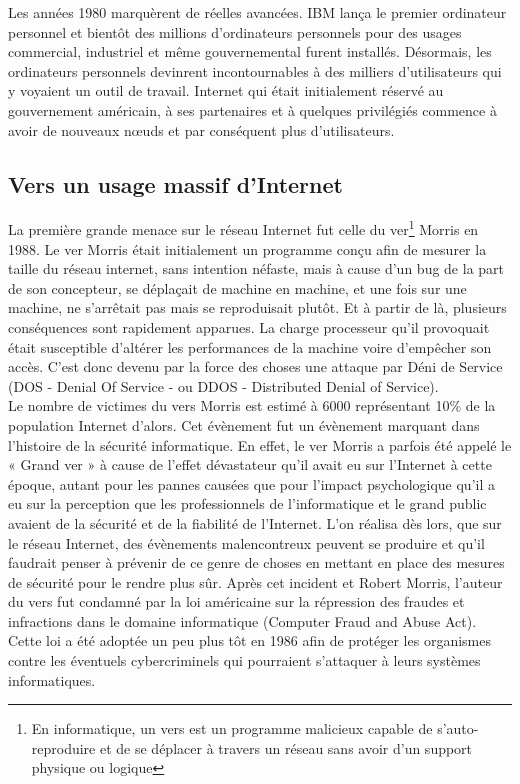 Les années 1980 marquèrent de réelles avancées. IBM lança le premier ordinateur personnel et bientôt des millions d’ordinateurs personnels pour des usages commercial, industriel et même gouvernemental furent installés. Désormais, les ordinateurs personnels devinrent incontournables à des milliers d’utilisateurs qui y voyaient un outil de travail. Internet qui était initialement réservé au gouvernement américain, à ses partenaires et à quelques privilégiés commence à avoir de nouveaux nœuds et par conséquent plus d’utilisateurs. 
\subsection{Vers un usage massif d'Internet}
La première grande menace sur le réseau Internet fut celle du ver\footnote{En informatique, un vers est un programme malicieux capable de s’auto-reproduire et de se déplacer à travers un réseau sans avoir d’un support physique ou logique} Morris \cite{morris-worm} en 1988. Le ver Morris  était initialement un programme conçu afin de mesurer la taille du réseau internet, sans intention néfaste, mais à cause d’un bug de la part de son concepteur, se déplaçait de machine en machine, et une fois sur une machine, ne s’arrêtait pas mais se reproduisait plutôt. Et à partir de là, plusieurs conséquences sont rapidement apparues. La charge processeur qu’il provoquait était susceptible d’altérer les performances de la machine voire d’empêcher son accès. C’est donc devenu par la force des choses une attaque par Déni de Service (DOS   - Denial Of Service - ou DDOS - Distributed Denial of Service). \\
Le nombre de victimes du vers Morris est estimé à 6000 représentant 10\% de la population Internet d’alors. Cet évènement fut un évènement marquant dans l’histoire de la sécurité informatique. En  effet, le ver Morris a parfois été appelé le « Grand ver » à cause de l'effet dévastateur qu'il avait eu sur l'Internet à cette époque, autant pour les pannes causées que pour l'impact psychologique qu'il a eu sur la perception que les professionnels de l’informatique et le grand public avaient de la sécurité et de la fiabilité de l'Internet. L’on réalisa dès lors, que sur le réseau Internet, des évènements malencontreux peuvent se produire et qu’il faudrait penser à prévenir de ce genre de choses en mettant en place des mesures de sécurité pour le rendre plus sûr. Après cet incident et Robert Morris, l’auteur du vers fut condamné par la loi américaine sur la répression des fraudes et infractions dans le domaine informatique (Computer Fraud and Abuse Act). Cette loi a été adoptée un peu plus tôt en 1986 afin de protéger les organismes contre les éventuels cybercriminels qui pourraient s’attaquer à leurs systèmes informatiques.

